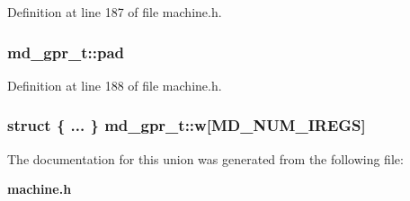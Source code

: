 Definition at line 187 of file machine.h.
\subsubsection[{pad}]{ {\bf md\_\-gpr\_\-t::pad}}\label{unionmd__gpr__t_1e318139973aabdb9c78b4c2fe3c7ece}




Definition at line 188 of file machine.h.
\subsubsection[{w}]{\setlength{\rightskip}{0pt plus 5cm}struct \{ ... \}   {\bf md\_\-gpr\_\-t::w}[MD\_\-NUM\_\-IREGS]}\label{unionmd__gpr__t_746fba487dbcbfdc47a8d339c41b9b64}




The documentation for this union was generated from the following file:\begin{CompactItemize}
\item 
{\bf machine.h}\end{CompactItemize}
